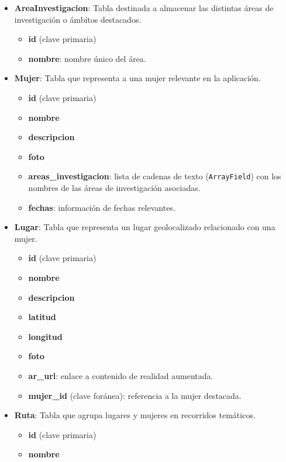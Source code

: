 \begin{itemize}
    \item \textbf{AreaInvestigacion}: Tabla destinada a almacenar las distintas áreas de investigación o ámbitos destacados.
    \begin{itemize}
        \item \textbf{id} (clave primaria)
        \item \textbf{nombre}: nombre único del área.
    \end{itemize}
    \item \textbf{Mujer}: Tabla que representa a una mujer relevante en la aplicación.
    \begin{itemize}
        \item \textbf{id} (clave primaria)
        \item \textbf{nombre}
        \item \textbf{descripcion}
        \item \textbf{foto}
        \item \textbf{areas\_investigacion}: lista de cadenas de texto (\texttt{ArrayField}) con los nombres de las áreas de investigación asociadas.
        \item \textbf{fechas}: información de fechas relevantes.
    \end{itemize}
    \item \textbf{Lugar}: Tabla que representa un lugar geolocalizado relacionado con una mujer.
    \begin{itemize}
        \item \textbf{id} (clave primaria)
        \item \textbf{nombre}
        \item \textbf{descripcion}
        \item \textbf{latitud}
        \item \textbf{longitud}
        \item \textbf{foto}
        \item \textbf{ar\_url}: enlace a contenido de realidad aumentada.
        \item \textbf{mujer\_id} (clave foránea): referencia a la mujer destacada.
    \end{itemize}
    \item \textbf{Ruta}: Tabla que agrupa lugares y mujeres en recorridos temáticos.
    \begin{itemize}
        \item \textbf{id} (clave primaria)
        \item \textbf{nombre}

\end{itemize}
\end{itemize}
